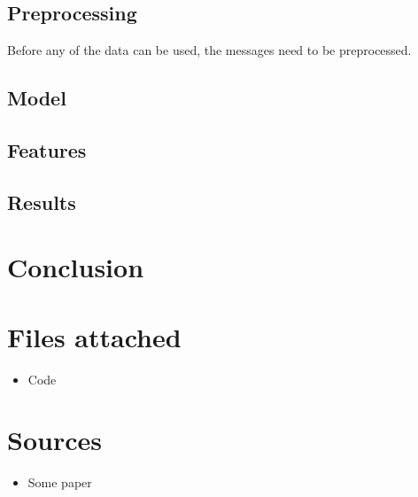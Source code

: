 \documentclass{article}
\begin{document}
\subsection*{Preprocessing}

Before any of the data can be used, the messages need to be preprocessed. 

\subsection*{Model}

\subsection*{Features}


\subsection*{Results}

\pagebreak

\section*{Conclusion}

\section*{Files attached}
\begin{itemize}
\item Code
\end{itemize}

\section*{Sources}

\begin{itemize}

\item Some paper
\end{itemize}
\end{document}
